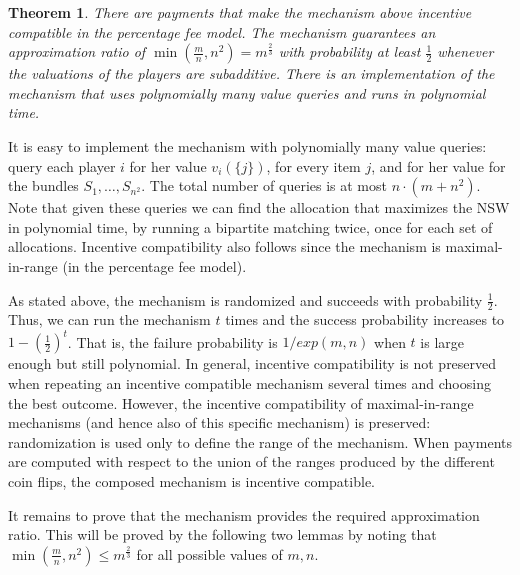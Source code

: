 \documentclass{article}
\newtheorem{theorem}{Theorem}\newtheorem{lemma}[theorem]{Lemma}\newtheorem{proposition}[theorem]{Proposition}\newtheorem{corollary}[theorem]{Corollary}\newtheorem{definition}[theorem]{Definition}\newtheorem{claim}[theorem]{Claim}\newtheorem*{claim*}{Claim}\newenvironment{subproof}{\begin{proof}[Proof of claim]}{\end{proof}}
\begin{document}
\begin{theorem}
There are payments that make the mechanism above incentive compatible in the percentage fee model. The mechanism guarantees an approximation ratio of $\min(\frac m n, n^2)=m^{\frac 2 3}$ with probability at least $\frac 1 2$ whenever the valuations of the players are subadditive. There is an implementation of the mechanism that uses polynomially many value queries and runs in polynomial time.
\end{theorem}

It is easy to implement the mechanism with polynomially many value queries: query each player $i$ for her value $v_i(\{j\})$, for every item $j$, and for her value for the bundles $S_1,\ldots, S_{n^2}$. The total number of queries is at most $n\cdot (m+n^2)$. Note that given these queries we can find the allocation that maximizes the NSW in polynomial time, by running a bipartite matching twice, once for each set of allocations. Incentive compatibility also follows since the mechanism is maximal-in-range (in the percentage fee model). 

As stated above, the mechanism is randomized and succeeds with probability $\frac 1  2$. Thus, we can run the mechanism $t$ times and the success probability increases to $1-(\frac 1 2)^t$. That is, the failure probability is $1/exp(m,n)$ when $t$ is large enough but still polynomial. In general, incentive compatibility is not preserved when repeating an incentive compatible mechanism several times and choosing the best outcome. However, the incentive compatibility of maximal-in-range mechanisms (and hence also of this specific mechanism) is preserved: randomization is used only to define the range of the mechanism. When payments are computed with respect to the union of the ranges produced by the different coin flips, the composed mechanism is incentive compatible.

It remains to prove that the mechanism provides the required approximation ratio. This will be proved by the following two lemmas by noting that $\min(\frac m n, n^2)\leq m^{\frac 2 3}$ for all possible values of $m,n$.
\end{document}

